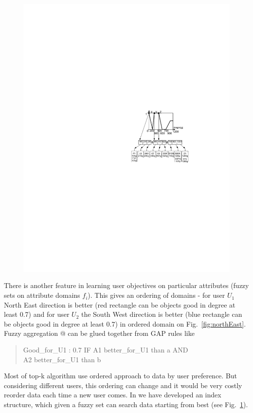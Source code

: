 \begin{figure}[ht]
\begin{minipage}[b]{0.5\hsize}
		\includegraphics[width=\hsize]{img/index}
\caption{}
\label{fig:index}
\end{minipage}
\end{figure}


     There is another feature in learning user objectives on particular attributes (fuzzy sets on attribute domains $f_i$). This gives an ordering of domains - for user $U_1$ North East direction is better (red rectangle can be objects good in degree at least 0.7) and for user $U_2$ the South West direction is better (blue rectangle can be objects good in degree at least 0.7)  in ordered domain on Fig.~\ref{fig:northEast}. Fuzzy aggregation @ can be glued together from GAP rules like
\begin{quote}
Good\_for\_U1 : 0.7 IF A1 better\_for\_U1 than a AND\\ A2 better\_for\_U1 than b	
\end{quote}
Most of top-k algorithm use ordered approach to data by user preference. But considering different users, this ordering can change and it would be very costly reorder data each time a new user comes. In \cite{29} we have developed an index structure, which given a fuzzy set can search data starting from best (see Fig.~\ref{fig:index}). 


